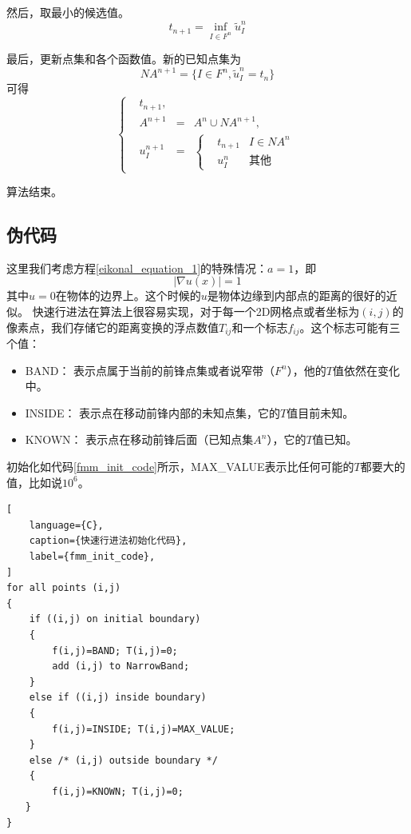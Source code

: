 然后，取最小的候选值。
\begin{equation*}
    \label{min_tn+1}
    t_{n+1} = \underset{I \in F^n}{\inf} \widetilde{u}^n_I
\end{equation*}

最后，更新点集和各个函数值。新的已知点集为
\begin{equation*}
    \label{new_an+1}
    NA^{n+1} = \{I \in F^n, \widetilde{u}^n_I = t_n\}
\end{equation*}
可得
\begin{equation*}
    \label{new_values}
    \left\{
    \begin{aligned}
    & t_{n+1},\\
    & A^{n+1} & = & A^n \cup NA^{n+1}, \\
    & u^{n+1}_I & = & \left\{
        \begin{aligned}
        & t_{n+1} & I \in NA^n \\
        & u^n_I & \mbox{其他}
        \end{aligned}
        \right.
    \end{aligned}
    \right.
\end{equation*}

算法结束。

\subsection{伪代码}
\label{pseudocode}
这里我们考虑方程\ref{eikonal_equation_1}的特殊情况：$a = 1$，即
\begin{equation}
    \label{special_eikonal_equation}
    \left| \nabla u(x) \right| = 1
\end{equation}
其中$u = 0$在物体的边界上。这个时候的$u$是物体边缘到内部点的距离的很好的近似。
快速行进法在算法上很容易实现，对于每一个2D网格点或者坐标为$(i, j)$的像素点，我们存储它的距离变换的浮点数值$T_{ij}$和一个标志$f_{ij}$。这个标志可能有三个值：
\begin{itemize}
\item BAND： 表示点属于当前的前锋点集或者说窄带（$F^n$），他的$T$值依然在变化中。
\item INSIDE： 表示点在移动前锋内部的未知点集，它的$T$值目前未知。
\item KNOWN： 表示点在移动前锋后面（已知点集$A^n$），它的$T$值已知。
\end{itemize}

初始化如代码\ref{fmm_init_code}所示，MAX\_VALUE表示比任何可能的$T$都要大的值，比如说$10^6$。
\begin{lstlisting}[
    language={C},
    caption={快速行进法初始化代码},
    label={fmm_init_code},
]
for all points (i,j)
{
    if ((i,j) on initial boundary)
    {
        f(i,j)=BAND; T(i,j)=0;
        add (i,j) to NarrowBand;
    }
    else if ((i,j) inside boundary)
    {
        f(i,j)=INSIDE; T(i,j)=MAX_VALUE;
    }
    else /* (i,j) outside boundary */
    {
        f(i,j)=KNOWN; T(i,j)=0;
　　}
}
\end{lstlisting}

